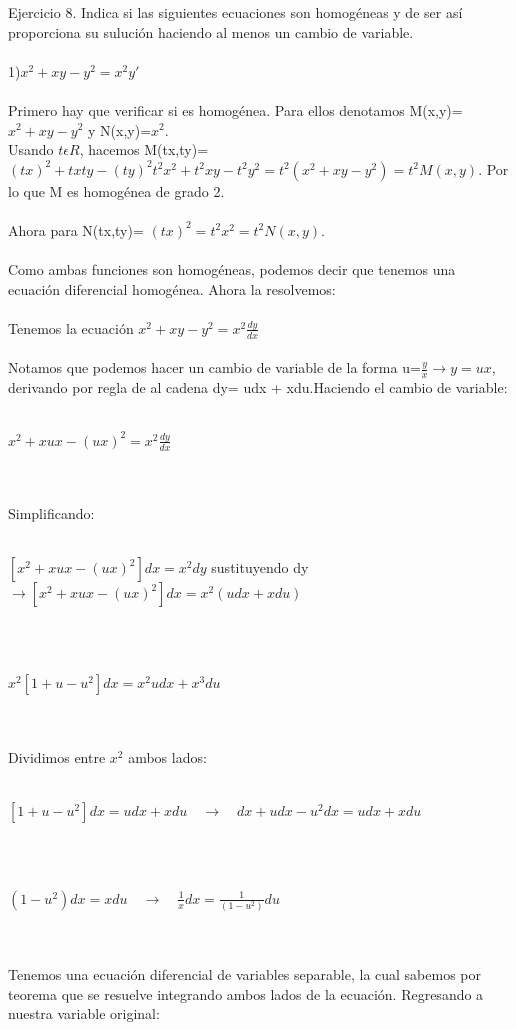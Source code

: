 \documentclass[a4paper,10pt]{article}
\begin{document}
Ejercicio 8. Indica si las siguientes ecuaciones son homogéneas y de ser así proporciona su sulución haciendo al menos un cambio de variable.\\\\
1)$x^2 + xy -y^2 = x^2y'$\\\\
Primero hay que verificar si es homogénea. Para ellos denotamos M(x,y)= $x^2 + xy -y^2 $ y N(x,y)=$ x^2$.\\
Usando $t\epsilon R$, hacemos M(tx,ty)= $(tx)^2 + txty -(ty)^2  t^2x^2 + t^2xy -t^2y^2= t^2(x^2 + xy -y^2) = t^2 M(x,y)$. Por lo que M es homogénea de grado 2.\\\\
Ahora para N(tx,ty)= $(tx)^2 = t^2 x^2 = t^2 N(x,y)$.\\\\
Como ambas funciones son homogéneas, podemos decir que tenemos una ecuación diferencial homogénea. Ahora la resolvemos:\\\\
Tenemos la ecuación $x^2 + xy -y^2 = x^2\frac{dy}{dx}$\\\\
Notamos que podemos hacer un cambio de variable de la forma u=$\frac{y}{x} \rightarrow y=ux$, derivando por regla de al cadena dy= udx + xdu.Haciendo el cambio de variable:\\\\
\centerline{$x^2 + xux -(ux)^2 = x^2\frac{dy}{dx}$}\\\\
Simplificando:\\\\
\centerline{$[x^2 + xux -(ux)^2]dx = x^2 dy $ sustituyendo dy $\rightarrow [x^2 + xux -(ux)^2]dx = x^2 (udx + xdu) $}\\\\
\centerline{$x^2[1+u-u^2]dx = x^2udx + x^3du $}\\\\
Dividimos entre $x^2$ ambos lados:\\\\
\centerline{$[1+u-u^2]dx = udx + xdu \quad\rightarrow\quad dx+udx-u^2 dx = udx + xdu$}\\\\
\centerline{$ (1-u^2) dx = x du\quad\rightarrow\quad \frac{1}{x} dx =  \frac{1}{(1-u^2)}du$}\\\\
Tenemos una ecuación diferencial de variables separable, la cual sabemos por teorema que se resuelve integrando ambos lados de la ecuación. Regresando a nuestra variable original:\\\\
\end{document}
